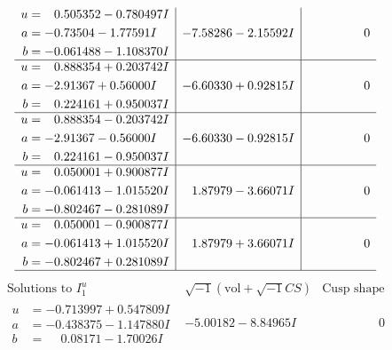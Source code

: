 \documentclass[1p]{elsarticle_modified}
\theoremstyle{definition}
\newcommand{\I}{\sqrt{-1}}
\begin{document}
$$\begin{array}{c|c|c}
\begin{aligned}
u &= \phantom{-}0.505352 - 0.780497 I \\
a &= -0.73504 - 1.77591 I \\
b &= -0.061488 - 1.108370 I\end{aligned}
 & -7.58286 - 2.15592 I & \phantom{-0.000000 } 0 \\ \hline\begin{aligned}
u &= \phantom{-}0.888354 + 0.203742 I \\
a &= -2.91367 + 0.56000 I \\
b &= \phantom{-}0.224161 + 0.950037 I\end{aligned}
 & -6.60330 + 0.92815 I & \phantom{-0.000000 } 0 \\ \hline\begin{aligned}
u &= \phantom{-}0.888354 - 0.203742 I \\
a &= -2.91367 - 0.56000 I \\
b &= \phantom{-}0.224161 - 0.950037 I\end{aligned}
 & -6.60330 - 0.92815 I & \phantom{-0.000000 } 0 \\ \hline\begin{aligned}
u &= \phantom{-}0.050001 + 0.900877 I \\
a &= -0.061413 - 1.015520 I \\
b &= -0.802467 - 0.281089 I\end{aligned}
 & \phantom{-}1.87979 - 3.66071 I & \phantom{-0.000000 } 0 \\ \hline\begin{aligned}
u &= \phantom{-}0.050001 - 0.900877 I \\
a &= -0.061413 + 1.015520 I \\
b &= -0.802467 + 0.281089 I\end{aligned}
 & \phantom{-}1.87979 + 3.66071 I & \phantom{-0.000000 } 0\\
 \hline 
 \end{array}$$\newpage$$\begin{array}{c|c|c}  
\text{Solutions to }I^u_{1}& \I (\text{vol} + \sqrt{-1}CS) & \text{Cusp shape}\\
 \hline 
\begin{aligned}
u &= -0.713997 + 0.547809 I \\
a &= -0.438375 - 1.147880 I \\
b &= \phantom{-}0.08171 - 1.70026 I\end{aligned}
 & -5.00182 - 8.84965 I & \phantom{-0.000000 } 0 \\ \hline\begin{aligned}

\end{aligned}
\end{array}$$
\end{document}
